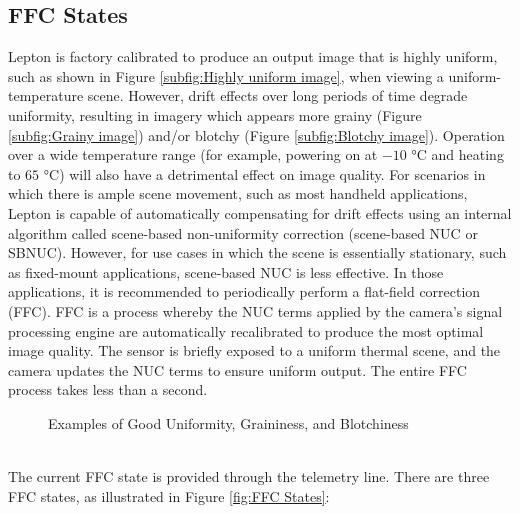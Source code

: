 \subsection{FFC States}
\label{ssec:FFCstates}
Lepton is factory calibrated to produce an output image that is highly uniform,
such as shown in Figure \ref{subfig:Highly uniform image}, when viewing a
uniform-temperature scene. However, drift effects over long periods of time
degrade uniformity, resulting in imagery which appears more grainy (Figure
\ref{subfig:Grainy image}) and/or blotchy (Figure \ref{subfig:Blotchy image}).
Operation over a wide temperature range (for example, powering on at $-10$
\si{\celsius} and heating to $65$ \si{\celsius}) will also have a detrimental
effect on image quality. For scenarios in which there is ample scene movement,
such as most handheld applications, Lepton is capable of automatically
compensating for drift effects using an internal algorithm called scene-based
non-uniformity correction (scene-based NUC or SBNUC). However, for use cases in
which the scene is essentially stationary, such as fixed-mount applications,
scene-based NUC is less effective. In those applications, it is recommended to
periodically perform a flat-field correction (FFC). FFC is a process whereby the
NUC terms applied by the camera's signal processing engine are automatically
recalibrated to produce the most optimal image quality. The sensor is briefly
exposed to a uniform thermal scene, and the camera updates the NUC terms to
ensure uniform output. The entire FFC process takes less than a second.
%
\begin{figure}[htb]
    \centering
     \quad
     \quad
    \caption{Examples of Good Uniformity, Graininess, and Blotchiness}
    \label{fig:exampleffc}
\end{figure}
%
\\The current FFC state is provided through the telemetry line. There are three
FFC states, as illustrated in Figure \ref{fig:FFC States}:
